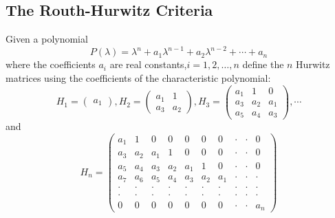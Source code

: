 \documentclass[leqno,DIV=calc,paper=a4,fontsize=11pt]{article}
\theoremstyle{definition}
\theoremstyle{plain}
\theoremstyle{remark}
\begin{document}
\subsection{The Routh-Hurwitz Criteria}
Given a polynomial
\[
P(\lambda)=\lambda^n+a_1\lambda^{n-1}+a_2\lambda^{n-2}+\cdots+a_n
\]
where the coefficients $a_i$ are real constants,$i=1,2,\ldots,n$ define the $n$ Hurwitz matrices using the coefficients of the characteristic polynomial:
$$
H_1=
\begin{pmatrix}
a_1
\end{pmatrix},
H_2=
\begin{pmatrix}
a_1  & 1  \\
a_3  & a_2
\end{pmatrix},
H_3=
\begin{pmatrix}
a_1  & 1    & 0   \\
a_3  & a_2  & a_1  \\
a_5  & a_4  & a_3
\end{pmatrix},\cdots
$$
and
$$
H_n=
\begin{pmatrix}
a_1  & 1    & 0    & 0    & 0    & 0    & 0    & \cdot & \cdot & 0  \\
a_3  & a_2  & a_1  & 1    & 0    & 0    & 0    & \cdot & \cdot & 0  \\
a_5  & a_4  & a_3  & a_2  & a_1  & 1    & 0    & \cdot & \cdot & 0   \\
a_7  & a_6  & a_5  & a_4  & a_3  & a_2  & a_1  & \cdot & \cdot & \cdot \\
\cdot & \cdot & \cdot & \cdot & \cdot & \cdot & \cdot & \cdot & \cdot & \cdot\\
\cdot & \cdot & \cdot & \cdot & \cdot & \cdot & \cdot & \cdot & \cdot & \cdot \\
0    & 0    & 0    &  0   &  0   & 0    & 0    & \cdot & \cdot & a_n
\end{pmatrix}
$$
\end{document}
